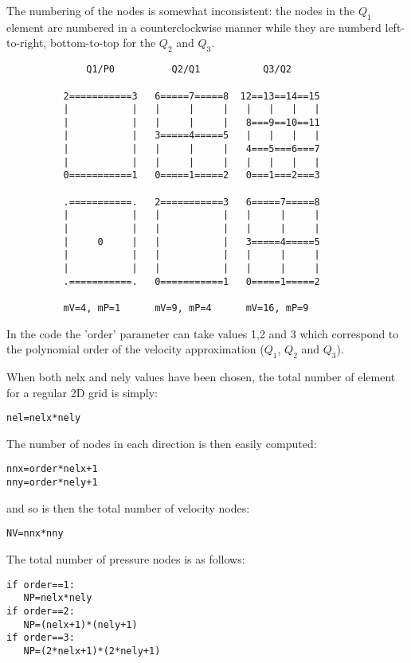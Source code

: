The numbering of the nodes is somewhat inconsistent: the nodes in the $Q_1$
element are numbered in a counterclockwise manner while they are numberd
left-to-right, bottom-to-top for the $Q_2$ and $Q_3$.

\begin{verbatim}
              Q1/P0          Q2/Q1           Q3/Q2
          
          2===========3   6=====7=====8  12==13==14==15
          |           |   |     |     |   |   |   |   |
          |           |   |     |     |   8===9==10==11
          |           |   3=====4=====5   |   |   |   |
          |           |   |     |     |   4===5===6===7
          |           |   |     |     |   |   |   |   |
          0===========1   0=====1=====2   0===1===2===3

          .===========.   2===========3   6=====7=====8
          |           |   |           |   |     |     |
          |           |   |           |   |     |     |
          |     0     |   |           |   3=====4=====5
          |           |   |           |   |     |     |
          |           |   |           |   |     |     |
          .===========.   0===========1   0=====1=====2       

          mV=4, mP=1      mV=9, mP=4      mV=16, mP=9  

\end{verbatim}

In the code the 'order' parameter can take values 1,2 and 3 which 
correspond to the polynomial order of the velocity approximation ($Q_1$, $Q_2$ and $Q_3$).

When both nelx and nely values have been chosen, the total number of element 
for a regular 2D grid is simply:
\begin{lstlisting}
nel=nelx*nely
\end{lstlisting}

The number of nodes in each direction is then easily computed:
\begin{lstlisting}
nnx=order*nelx+1 
nny=order*nely+1 
\end{lstlisting}
and so is then the total number of velocity nodes:
\begin{lstlisting}
NV=nnx*nny
\end{lstlisting}

The total number of pressure nodes is as follows:
\begin{lstlisting}
if order==1:
   NP=nelx*nely
if order==2:
   NP=(nelx+1)*(nely+1)
if order==3:
   NP=(2*nelx+1)*(2*nely+1)
\end{lstlisting}

